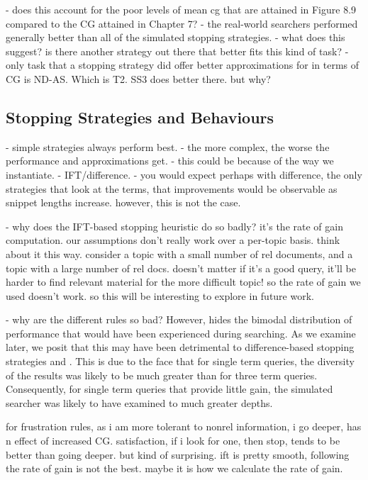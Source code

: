 - does this account for the poor levels of mean cg that are attained in Figure 8.9 compared to the CG attained in Chapter 7?
    - the real-world searchers performed generally better than all of the simulated stopping strategies.
        - what does this suggest? is there another strategy out there that better fits this kind of task?
        - only task that a stopping strategy did offer better approximations for in terms of CG is ND-AS. Which is T2. SS3 does better there. but why?

\subsection{Stopping Strategies and Behaviours}

- simple strategies always perform best.
- the more complex, the worse the performance and approximations get.
    - this could be because of the way we instantiate.
    - IFT/difference.
        - you would expect perhaps with difference, the only strategies that look at the terms, that improvements would be observable as snippet lengths increase. however, this is not the case.

- why does the IFT-based stopping heuristic do so badly? it's the rate of gain computation. our assumptions don't really work over a per-topic basis. think about it this way. consider a topic with a small number of rel documents, and a topic with a large number of rel docs. doesn't matter if it's a good query, it'll be harder to find relevant material for the more difficult topic! so the rate of gain we used doesn't work. so this will be interesting to explore in future work.

- why are the different rules so bad? However,  hides the bimodal distribution of performance that would have been experienced during searching. As we examine later, we posit that this may have been detrimental to difference-based stopping strategies  and . This is due to the face that for single term queries, the diversity of the results was likely to be much greater than for three term queries. Consequently, for single term queries that provide little gain, the simulated searcher was likely to have examined to much greater depths.

for frustration rules, as i am more tolerant to nonrel information, i go deeper, has n effect of increased CG.
satisfaction, if i look for one, then stop, tends to be better than going deeper. but kind of surprising.
ift is pretty smooth, following the rate of gain is not the best. maybe it is how we calculate the rate of gain.

